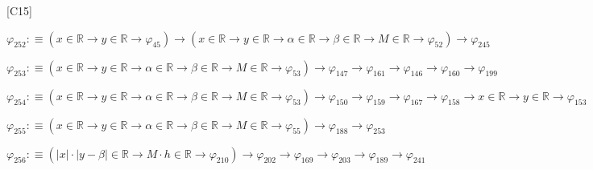 \begin{fullproof}{[C15]}
\begin{abbrevlist}
\item $\varphi_{252} :\equiv (x \in \mathbb{R} \to y \in \mathbb{R} \to \varphi_{45}) \to (x \in \mathbb{R} \to y \in \mathbb{R} \to \alpha \in \mathbb{R} \to \beta \in \mathbb{R} \to M \in \mathbb{R} \to \varphi_{52}) \to \varphi_{245}$
\item $\varphi_{253} :\equiv (x \in \mathbb{R} \to y \in \mathbb{R} \to \alpha \in \mathbb{R} \to \beta \in \mathbb{R} \to M \in \mathbb{R} \to \varphi_{53}) \to \varphi_{147} \to \varphi_{161} \to \varphi_{146} \to \varphi_{160} \to \varphi_{199}$
\item $\varphi_{254} :\equiv (x \in \mathbb{R} \to y \in \mathbb{R} \to \alpha \in \mathbb{R} \to \beta \in \mathbb{R} \to M \in \mathbb{R} \to \varphi_{53}) \to \varphi_{150} \to \varphi_{159} \to \varphi_{167} \to \varphi_{158} \to x \in \mathbb{R} \to y \in \mathbb{R} \to \varphi_{153}$
\item $\varphi_{255} :\equiv (x \in \mathbb{R} \to y \in \mathbb{R} \to \alpha \in \mathbb{R} \to \beta \in \mathbb{R} \to M \in \mathbb{R} \to \varphi_{55}) \to \varphi_{188} \to \varphi_{253}$
\item $\varphi_{256} :\equiv (\lvert x \rvert \cdot \lvert y - \beta \rvert \in \mathbb{R} \to M \cdot h \in \mathbb{R} \to \varphi_{210}) \to \varphi_{202} \to \varphi_{169} \to \varphi_{203} \to \varphi_{189} \to \varphi_{241}$
\end{abbrevlist}
\end{fullproof}
